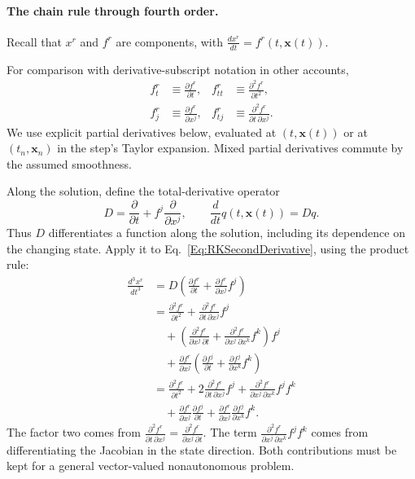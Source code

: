 \paragraph{The chain rule through fourth order.}
Recall that $x^r$ and $f^r$ are components, with
$\frac{dx^r}{dt}=f^r(t,\mathbf x(t))$.

For comparison with derivative-subscript notation in other accounts,
\begin{equation}\label{Eq:RKPartialDerivativeDictionary}
\begin{aligned}
 f_t^r&\equiv\frac{\partial f^r}{\partial t},
 &f_{tt}^r&\equiv\frac{\partial^2 f^r}{\partial t^2},\\
 f_j^r&\equiv\frac{\partial f^r}{\partial x^j},
 &f_{tj}^r&\equiv\frac{\partial^2 f^r}{\partial t\,\partial x^j}.
\end{aligned}
\end{equation}
We use explicit partial derivatives below, evaluated at $(t,\mathbf x(t))$
or at $(t_n,\mathbf x_n)$ in the step's Taylor expansion. Mixed partial
derivatives commute by the assumed smoothness.

Along the solution, define the total-derivative operator
\begin{equation}\label{Eq:RKTotalDerivative}
 D=\frac{\partial}{\partial t}
        + f^j\frac{\partial}{\partial x^j},
 \qquad \frac{d}{dt}q(t,\mathbf x(t))=Dq.
\end{equation}
Thus $D$ differentiates a function along the solution, including its
dependence on the changing state. Apply it to
Eq.~\ref{Eq:RKSecondDerivative}, using the product rule:
\begin{equation}\label{Eq:RKThirdDerivativeExpanded}
\begin{aligned}
 \frac{d^3x^r}{dt^3}
 &=D\left(\frac{\partial f^r}{\partial t}
              +\frac{\partial f^r}{\partial x^j}f^j\right)\\
 &=\frac{\partial^2f^r}{\partial t^2}
       +\frac{\partial^2f^r}{\partial t\,\partial x^j}f^j\\
 &\quad+\left(\frac{\partial^2f^r}{\partial x^j\,\partial t}
       +\frac{\partial^2f^r}{\partial x^j\,\partial x^k}f^k\right)f^j\\
 &\quad+\frac{\partial f^r}{\partial x^j}
       \left(\frac{\partial f^j}{\partial t}
             +\frac{\partial f^j}{\partial x^k}f^k\right)\\
 &=\frac{\partial^2f^r}{\partial t^2}
       +2\frac{\partial^2f^r}{\partial t\,\partial x^j}f^j
       +\frac{\partial^2f^r}{\partial x^j\,\partial x^k}f^j f^k\\
 &\quad+\frac{\partial f^r}{\partial x^j}\frac{\partial f^j}{\partial t}
       +\frac{\partial f^r}{\partial x^j}
        \frac{\partial f^j}{\partial x^k}f^k.
\end{aligned}
\end{equation}
The factor two comes from
$\frac{\partial^2f^r}{\partial t\,\partial x^j}
=\frac{\partial^2f^r}{\partial x^j\,\partial t}$.
The term
$\frac{\partial^2f^r}{\partial x^j\,\partial x^k}f^j f^k$
comes from differentiating the Jacobian in the state direction.
Both contributions must be kept for a general vector-valued
nonautonomous problem.

